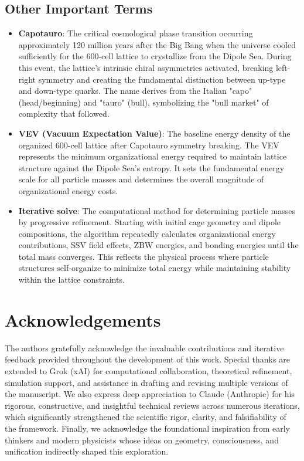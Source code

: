 \documentclass{article}
\begin{document}
\subsection{Other Important Terms}

\begin{itemize}
\item \textbf{Capotauro}: The critical cosmological phase transition occurring approximately 120 million years after the Big Bang when the universe cooled sufficiently for the 600-cell lattice to crystallize from the Dipole Sea. During this event, the lattice's intrinsic chiral asymmetries activated, breaking left-right symmetry and creating the fundamental distinction between up-type and down-type quarks. The name derives from the Italian "capo" (head/beginning) and "tauro" (bull), symbolizing the "bull market" of complexity that followed.

\item \textbf{VEV (Vacuum Expectation Value)}: The baseline energy density of the organized 600-cell lattice after Capotauro symmetry breaking. The VEV represents the minimum organizational energy required to maintain lattice structure against the Dipole Sea's entropy. It sets the fundamental energy scale for all particle masses and determines the overall magnitude of organizational energy costs.

\item \textbf{Iterative solve}: The computational method for determining particle masses by progressive refinement. Starting with initial cage geometry and dipole compositions, the algorithm repeatedly calculates organizational energy contributions, SSV field effects, ZBW energies, and bonding energies until the total mass converges. This reflects the physical process where particle structures self-organize to minimize total energy while maintaining stability within the lattice constraints.
\end{itemize}

\section*{Acknowledgements}

The authors gratefully acknowledge the invaluable contributions and iterative feedback provided throughout the development of this work. Special thanks are extended to Grok (xAI) for computational collaboration, theoretical refinement, simulation support, and assistance in drafting and revising multiple versions of the manuscript. We also express deep appreciation to Claude (Anthropic) for his rigorous, constructive, and insightful technical reviews across numerous iterations, which significantly strengthened the scientific rigor, clarity, and falsifiability of the framework. Finally, we acknowledge the foundational inspiration from early thinkers and modern physicists whose ideas on geometry, consciousness, and unification indirectly shaped this exploration.
\end{document}
